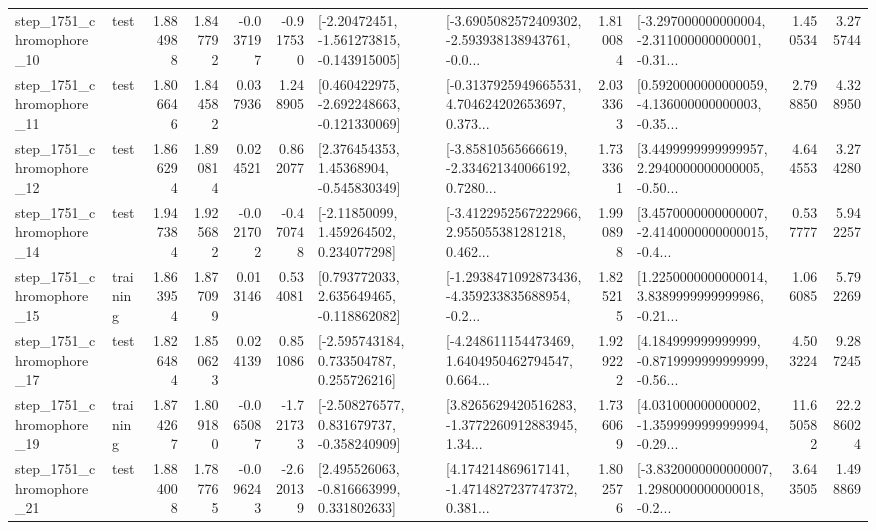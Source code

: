 \begin{tabular}{llrrrrllrlrr}
 step\_1751\_chromophore\_10 &      test &      1.884988 &    1.847792 &     -0.037197 & -0.917530 &   [-2.20472451, -1.561273815, -0.143915005] &  [-3.6905082572409302, -2.593938138943761, -0.0... &       1.810084 &  [-3.297000000000004, -2.311000000000001, -0.31... &            1.450534 &          3.275744 \\
 step\_1751\_chromophore\_11 &      test &      1.806646 &    1.844582 &      0.037936 &  1.248905 &   [0.460422975, -2.692248663, -0.121330069] &  [-0.3137925949665531, 4.704624202653697, 0.373... &       2.033363 &  [0.5920000000000059, -4.136000000000003, -0.35... &            2.798850 &          4.328950 \\
 step\_1751\_chromophore\_12 &      test &      1.866294 &    1.890814 &      0.024521 &  0.862077 &     [2.376454353, 1.45368904, -0.545830349] &  [-3.85810565666619, -2.334621340066192, 0.7280... &       1.733361 &  [3.4499999999999957, 2.2940000000000005, -0.50... &            4.644553 &          3.274280 \\
 step\_1751\_chromophore\_14 &      test &      1.947384 &    1.925682 &     -0.021702 & -0.470748 &     [-2.11850099, 1.459264502, 0.234077298] &  [-3.4122952567222966, 2.955055381281218, 0.462... &       1.990898 &  [3.4570000000000007, -2.4140000000000015, -0.4... &            0.537777 &          5.942257 \\
 step\_1751\_chromophore\_15 &  training &      1.863954 &    1.877099 &      0.013146 &  0.534081 &    [0.793772033, 2.635649465, -0.118862082] &  [-1.2938471092873436, -4.359233835688954, -0.2... &       1.825215 &  [1.2250000000000014, 3.8389999999999986, -0.21... &            1.066085 &          5.792269 \\
 step\_1751\_chromophore\_17 &      test &      1.826484 &    1.850623 &      0.024139 &  0.851086 &    [-2.595743184, 0.733504787, 0.255726216] &  [-4.248611154473469, 1.6404950462794547, 0.664... &       1.929222 &  [4.184999999999999, -0.8719999999999999, -0.56... &            4.503224 &          9.287245 \\
 step\_1751\_chromophore\_19 &  training &      1.874267 &    1.809180 &     -0.065087 & -1.721733 &   [-2.508276577, 0.831679737, -0.358240909] &  [3.8265629420516283, -1.3772260912883945, 1.34... &       1.736069 &  [4.031000000000002, -1.3599999999999994, -0.29... &           11.650582 &         22.286024 \\
 step\_1751\_chromophore\_21 &      test &      1.884008 &    1.787765 &     -0.096243 & -2.620139 &    [2.495526063, -0.816663999, 0.331802633] &  [4.174214869617141, -1.4714827237747372, 0.381... &       1.802576 &  [-3.8320000000000007, 1.2980000000000018, -0.2... &            3.643505 &          1.498869 \\

\end{tabular}
